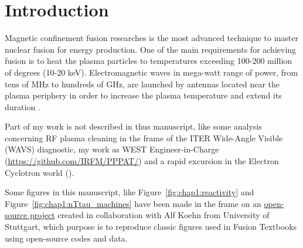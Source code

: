 \setchapterpreamble[u]{\margintoc}
\chapter{Introduction}

Magnetic confinement fusion researches is the most advanced technique to master nuclear fusion for energy production. One of the main requirements for achieving fusion is to heat the plasma particles to temperatures exceeding 100-200 million of degrees (10-20 keV). Electromagnetic waves in mega-watt range of power, from tens of MHz to hundreds of GHz, are launched by antennas located near the plasma periphery in order to increase the plasma temperature and extend its duration . 




Part of my work is not described in thus manuscript, like some analysis concerning RF plasma cleaning in the frame of the ITER Wide-Angle Visible (WAVS) diagnostic, my work as WEST Engineer-in-Charge (\href{https://github.com/IRFM/PPPAT/}{https://github.com/IRFM/PPPAT/}) and a rapid excursion in the Electron Cyclotron world (\cite{farthouat2010}). 


Some figures in this manuscript, like Figure~\ref{fig:chap1:reactivity} and Figure~\ref{fig:chap1:nTtau_machines} have been made in the frame on an \href{https://github.com/alfkoehn/fusion_plots/}{open-source project} created in collaboration with Alf Koehn from University of Stuttgart, which purpose is to reproduce classic figures used in Fusion Textbooks using open-source codes and data.